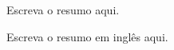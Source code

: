 
\begin{resumo}
    Escreva o resumo aqui.
\end{resumo}
\newpage

\begin{resumo}[Abstract]
    Escreva o resumo em inglês aqui.
\end{resumo}
\newpage

